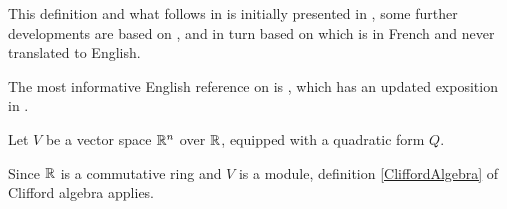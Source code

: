 \begin{remark}
  \label{mk:CliffordAlgebra}
  
  This definition and what follows in \Mathlib is initially presented in \cite{wieser2022formalizing},
  some further developments are based on \cite{grinberg2016clifford}, and in turn based on \cite{bourbaki2007}
  which is in French and never translated to English.

  The most informative English reference on \cite{bourbaki2007} is \cite{jadczyk2019notes}, 
  which has an updated exposition in \cite{jadczyk2023bundle}.

\end{remark}

\begin{example}
  \label{ex:clifford_algebra_v}

  Let $V$ be a vector space $\mathbb R^n$ over $\mathbb R$, equipped with a quadratic form $Q$.
  
  Since $\mathbb R$ is a commutative ring and $V$ is a module,
  definition \ref{CliffordAlgebra} of Clifford algebra applies.
\end{example}

